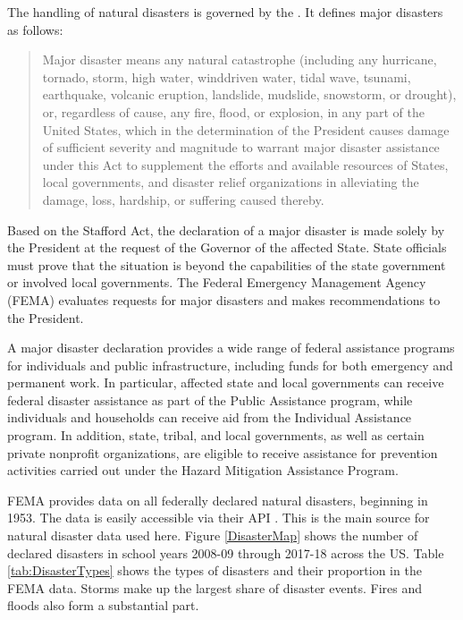 The handling of natural disasters is governed by the \cite{Stafford}. It defines major disasters as follows:
\begin{quote}
	 Major disaster means any natural catastrophe (including any 	hurricane, tornado, storm, high water, winddriven water, tidal wave, tsunami, earthquake, volcanic eruption, landslide, mudslide, snowstorm, or drought), or, regardless of cause, any fire, flood, or explosion, in any part of the United States, which in the determination of the President causes damage of sufficient severity and magnitude to warrant major disaster assistance under this Act to supplement the efforts and available resources of States, local governments, and disaster relief organizations in alleviating the damage, loss, hardship, or suffering caused thereby.
\end{quote}
Based on the Stafford Act, the declaration of a major disaster is made solely by the President at the request of the Governor of the affected State. State officials must prove that the situation is beyond the capabilities of the state government or involved local governments. The Federal Emergency Management Agency (FEMA) evaluates requests for major disasters and makes recommendations to the President.

A major disaster declaration provides a wide range of federal assistance programs for individuals and public infrastructure, including funds for both emergency and permanent work. In particular, affected state and local governments can receive federal disaster assistance as part of the Public Assistance program, while individuals and households can receive aid from the Individual Assistance program. In addition, state, tribal, and local governments, as well as certain private nonprofit organizations, are eligible to receive assistance for prevention activities carried out under the Hazard Mitigation Assistance Program.

FEMA provides data on all federally declared natural disasters, beginning in 1953. The data is easily accessible via their API \citep{rfema}. This is the main source for natural disaster data used here. Figure \ref{DisasterMap} shows the number of declared disasters in school years 2008-09 through 2017-18 across the US. Table \ref{tab:DisasterTypes} shows the types of disasters and their proportion in the FEMA data. Storms make up the largest share of disaster events. Fires and floods also form a substantial part.

